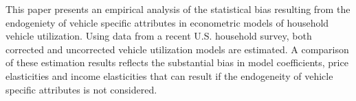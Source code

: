 This paper presents an empirical analysis of the statistical bias resulting from the endogeniety of vehicle specific attributes in econometric models of household vehicle utilization. Using data from a recent U.S. household survey, both corrected and uncorrected vehicle utilization models are estimated. A comparison of these estimation results reflects the substantial bias in model coefficients, price elasticities and income elasticities that can result if the endogeneity of vehicle specific attributes is not considered.
